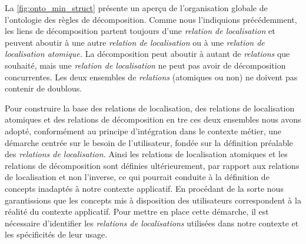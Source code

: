 La \autoref{fig:onto_min_struct} présente un aperçu de l'organisation
globale de l'ontologie des règles de décomposition. Comme nous
l'indiquions précédemment, les liens de décomposition partent toujours
d'une \emph{relation de localisation} et peuvent aboutir à une autre
\emph{relation de localisation} ou à une \emph{relation de
  localisation atomique.} La décomposition peut aboutir à autant de
\emph{relations} que souhaité, mais une \emph{relation de
  localisation} ne peut pas avoir de décomposition concurrentes. Les
deux ensembles de \emph{relations} (atomiques ou non) ne doivent pas
contenir de doublous.

Pour construire la base des relations de localisation, des relations
de localisation atomiques et des relations de décomposition en tre ces
deux ensembles nous avons adopté, conformément au principe
d'intégration dans le contexte métier, une démarche centrée sur le
besoin de l'utilisateur, \ie fondée sur la définition préalable des
\emph{relations de localisation.} Ainsi les relations de localisation
atomiques et les relations de décomposition sont définies
ultérieurement, par rapport aux relations de localisation et non
l'inverse, ce qui pourrait conduite à la définition de concepts
inadaptés à notre contexte applicatif.  En procédant de la sorte nous
garantissions que les concepts mis à disposition des utilisateurs
correspondent à la réalité du contexte applicatif. Pour mettre en
place cette démarche, il est nécessaire d'identifier les
\emph{relations de localisations} utilisées dans notre contexte et les
spécificités de leur usage.

